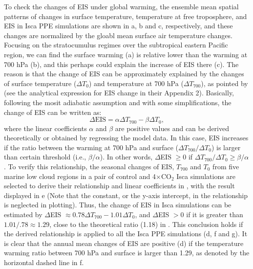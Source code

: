 To check the changes of EIS under global warming, the ensemble mean spatial patterns of changes in surface temperature, temperature at free troposphere, and EIS in Isca PPE simulations are shown in a, b and c, respectively, and these changes are normalized by the gloabl mean surface air temperature changes. Focusing on the stratocumulus regimes over the subtropical eastern Pacific region, we can find the surface warming (a) is relative lower than the warming at 700 hPa (b), and this perhaps could explain the increase of EIS there (c). The reason is that the change of EIS can be approximately explained by the changes of surface temperature ($\Delta T_0$) and temperature at 700 hPa ($\Delta T_{700}$), as pointed by \cite{Qu2014} (see the analytical expression for EIS change in their Appendix 2). Basically, following the mosit adiabatic assumption and with some simplifications, the change of EIS can be written as:
\begin{equation}
    \Delta\text{EIS} =\alpha \Delta T_{700} - \beta \Delta T_0,
    \label{eq:eis_change_T0_T700}
\end{equation}
where the linear coefficients $\alpha$ and $\beta$ are positive values and can be derived theoretically or obtained by regressing the model data. In this case, EIS increases if the ratio between the warming at 700 hPa and surface ($\Delta T_{700}/\Delta T_0$) is larger than certain threshold (i.e., $\beta/\alpha$). In other words, $\Delta$EIS $\geq 0$ if $\Delta T_{700}/\Delta T_0\geq \beta/\alpha$. To verify this relationship, the seasonal changes of EIS, $T_{700}$ and $T_{0}$ from five marine low cloud regions \citep{Klein1993,Qu2014} in a pair of control and 4$\times$CO$_2$ Isca simulations are selected to derive their relationship and linear coefficients in , with the result displayed in e (Note that the constant, or the y-axis intercept, in the relationship is neglected in plotting). Thus, the change of EIS in Isca simulations can be estimated by $\Delta$EIS $\approx 0.78\Delta T_{700} - 1.01\Delta T_0$, and $\Delta$EIS $>0$ if it is greater than $1.01/.78\approx1.29$, close to the theoretical ratio (1.18) in \cite{Qu2014}. This conclusion holds if the derived relationship is applied to all the Isca PPE simulations (d, f and g). It is clear that the annual mean changes of EIS are positive (d) if the temperature warming ratio between 700 hPa and surface is larger than 1.29, as denoted by the horizontal dashed line in f. 

